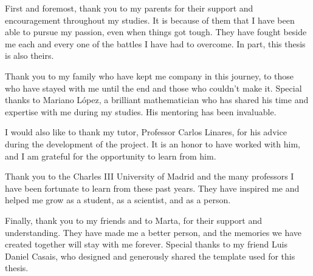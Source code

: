 \documentclass[en]{uc3mthesisIEEE}
\begin{document}
  \begin{acknowledgements}
    First and foremost, thank you to my parents for their support and encouragement throughout my studies. It is because of them that I have been able to pursue my passion, even when things got tough. They have fought beside me each and every one of the battles I have had to overcome. In part, this thesis is also theirs.

    Thank you to my family who have kept me company in this journey, to those who have stayed with me until the end and those who couldn't make it. Special thanks to Mariano López, a brilliant mathematician who has shared his time and expertise with me during my studies. His mentoring has been invaluable.

    I would also like to thank my tutor, Professor Carlos Linares, for his advice during the development of the project. It is an honor to have worked with him, and I am grateful for the opportunity to learn from him.

    Thank you to the Charles III University of Madrid and the many professors I have been fortunate to learn from these past years. They have inspired me and helped me grow as a student, as a scientist, and as a person.

    Finally, thank you to my friends and to Marta, for their support and understanding. They have made me a better person, and the memories we have created together will stay with me forever.
    Special thanks to my friend Luis Daniel Casais, who designed and generously shared the template used for this thesis. 
  \end{acknowledgements}


  \tableofcontents
  \listoffigures
  \listoftables
  \lstlistoflistings


  \begin{thesis}
    \begin{appendices}
    \end{appendices}
  \end{thesis}

  \cleardoublepage
  \label{bibliography}
  \printbibliography[heading=bibintoc]

  \cleardoublepage
  \label{glossary}
	\printglossaries


\end{document}
